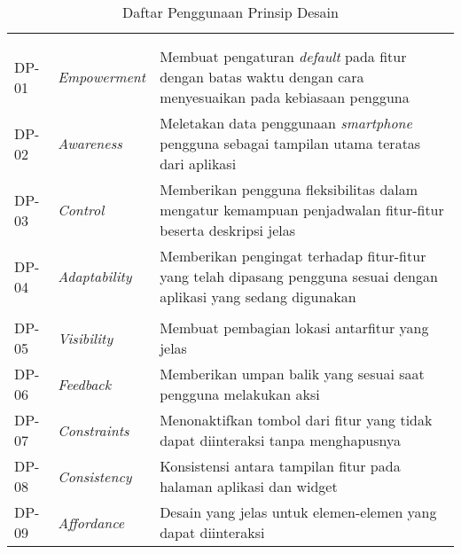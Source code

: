 \RaggedLeft
\begin{small}
\begin{longtable}[c]{|W{c}{0.07\textwidth}|>{\ccnormspacingcenter}m{0.18\textwidth}|>{\ccnormspacing}m{0.65\textwidth}|}
  \caption{Daftar Penggunaan Prinsip Desain}
  \label{tab:prinsip_desain} \\
  \hline {}
   &  &  \\ \hline \endfirsthead
  \hline {}
   &  &  \\ \hline \endhead

  \hline \endfoot
  
    \\ \hline
  DP-01 & \textit{Empowerment} & Membuat pengaturan \textit{default} pada fitur dengan batas waktu dengan cara menyesuaikan pada kebiasaan pengguna \\ \hline
  DP-02 & \textit{Awareness} & Meletakan data penggunaan \textit{smartphone} pengguna sebagai tampilan utama teratas dari aplikasi \\ \hline
  DP-03 & \textit{Control} & Memberikan pengguna fleksibilitas dalam mengatur kemampuan penjadwalan fitur-fitur beserta deskripsi jelas \\ \hline
  DP-04 & \textit{Adaptability} & Memberikan pengingat terhadap fitur-fitur yang telah dipasang pengguna sesuai dengan aplikasi yang sedang digunakan \\ \hline
    \\ \hline
  DP-05 & \textit{Visibility} & Membuat pembagian lokasi antarfitur yang jelas \\ \hline
  DP-06 & \textit{Feedback} & Memberikan umpan balik yang sesuai saat pengguna melakukan aksi \\ \hline
  DP-07 & \textit{Constraints} & Menonaktifkan tombol dari fitur yang tidak dapat diinteraksi tanpa menghapusnya \\ \hline
  DP-08 & \textit{Consistency} & Konsistensi antara tampilan fitur pada halaman aplikasi dan widget \\ \hline
  DP-09 & \textit{Affordance} & Desain yang jelas untuk elemen-elemen yang dapat diinteraksi \\ \hline

\end{longtable}
\end{small}
\justifying
\FloatBarrier

